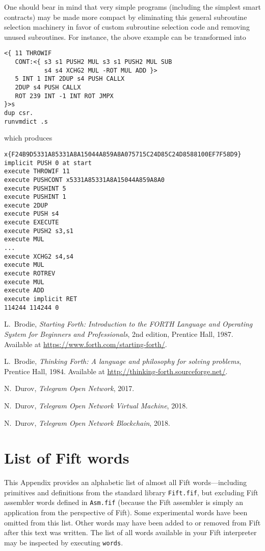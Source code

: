 \documentclass[12pt,oneside]{article}
\def\markbothsame#1{\fancyhead[C]{#1}}
\def\myappendix#1{\section{#1}\fancyhead[C]{\textsc{Appendix \textbf{\thesection.} #1}}}
\begin{document}
One should bear in mind that very simple programs (including the simplest smart contracts) may be made more compact by eliminating this general subroutine selection machinery in favor of custom subroutine selection code and removing unused subroutines. For instance, the above example can be transformed into
\begin{verbatim}
<{ 11 THROWIF
   CONT:<{ s3 s1 PUSH2 MUL s3 s1 PUSH2 MUL SUB
           s4 s4 XCHG2 MUL -ROT MUL ADD }>
   5 INT 1 INT 2DUP s4 PUSH CALLX
   2DUP s4 PUSH CALLX
   ROT 239 INT -1 INT ROT JMPX
}>s
dup csr.
runvmdict .s
\end{verbatim}
which produces   
\begin{verbatim}
x{F24B9D5331A85331A8A15044A859A8A075715C24D85C24D8588100EF7F58D9}
implicit PUSH 0 at start
execute THROWIF 11
execute PUSHCONT x5331A85331A8A15044A859A8A0
execute PUSHINT 5
execute PUSHINT 1
execute 2DUP
execute PUSH s4
execute EXECUTE
execute PUSH2 s3,s1
execute MUL
...
execute XCHG2 s4,s4
execute MUL
execute ROTREV
execute MUL
execute ADD
execute implicit RET
114244 114244 0
\end{verbatim}
  
%
%
%
%

\clearpage
\markbothsame{\textsc{References}}

\begin{thebibliography}{2}
  {\sc L.~Brodie}, {\sl Starting Forth: Introduction to the FORTH Language and Operating System for Beginners and Professionals}, 2nd edition, Prentice Hall, 1987. Available at \url{https://www.forth.com/starting-forth/}.

  {\sc L.~Brodie}, {\sl Thinking Forth: A language and philosophy for solving problems}, Prentice Hall, 1984. Available at \url{http://thinking-forth.sourceforge.net/}.

  {\sc N.~Durov}, {\sl Telegram Open Network}, 2017.

  {\sc N.~Durov}, {\sl Telegram Open Network Virtual Machine}, 2018.

  {\sc N.~Durov}, {\sl Telegram Open Network Blockchain}, 2018.
\end{thebibliography}

\clearpage
\appendix\myappendix{List of Fift words}\label{app:words}
This Appendix provides an alphabetic list of almost all Fift words---including primitives and definitions from the standard library {\tt Fift.fif}, but excluding Fift assembler words defined in {\tt Asm.fif} (because the Fift assembler is simply an application from the perspective of Fift). Some experimental words have been omitted from this list. Other words may have been added to or removed from Fift after this text was written. The list of all words available in your Fift interpreter may be inspected by executing {\tt words}.
\end{document}
